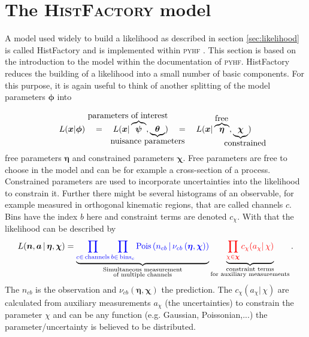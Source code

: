 \section{The \textsc{HistFactory} model}\label{sec:histfactory_model}

A model used widely to build a likelihood as described in section \ref{sec:likelihood} is called HistFactory \citep{cranmer2012histfactory} and is implemented within \textsc{pyhf} \citep{pyhf}. This section is based on the introduction to the model within the documentation of \textsc{pyhf}. HistFactory reduces the building of a likelihood into a small number of basic components. For this purpose, it is again useful to think of another splitting of the model parameters $\bm{\phi}$ into

\newcommand{\freeset}{\bm{\eta}}
\newcommand{\constrset}{\bm{\chi}}
\newcommand{\singleconstr}{\chi}
\newcommand{\channelcounts}{\bm{n}}
\newcommand{\auxdata}{\bm{a}}
\newcommand{\poiset}{\bm{\psi}}
\newcommand{\nuisset}{\bm{\theta}}
\newcommand{\fullset}{\bm{\phi}}
\newcommand{\singlefull}{\phi}


\begin{equation}
 L(\bm{x}|\fullset) \quad=\quad
 L(\bm{x}|\overbrace{\poiset}^{\llap{\text{parameters of interest}}},\underbrace{\nuisset}_{\llap{\text{nuisance parameters}}}) \quad=\quad
 L(\bm{x}|\overbrace{\freeset}^{\rlap{\text{free}}},\underbrace{\constrset}_{\rlap{\text{constrained}}}) 
\end{equation}
free parameters $\freeset$ and constrained parameters $\constrset$. Free parameters are free to choose in the model and can be for example a cross-section of a process. Constrained parameters are used to incorporate uncertainties into the likelihood to constrain it. Further there might be several histograms of an observable, for example measured in orthogonal kinematic regions, that are called channels $c$. Bins have the index $b$ here and constraint terms are denoted $c_{\singleconstr}$. With that the likelihood can be described by 
\begin{equation}
L(\channelcounts, \auxdata \,|\,\freeset,\constrset) = \underbrace{\color{blue}{\prod_{c\in\mathrm{\,channels}} \prod_{b \in \mathrm{\,bins}_c}\textrm{Pois}\left(n_{cb} \,\middle|\, \nu_{cb}\left(\freeset,\constrset\right)\right)}}_{\substack{\text{Simultaneous measurement}\\%
\text{of multiple channels}}} \underbrace{\color{red}{\prod_{\singleconstr \in \constrset} c_{\singleconstr}(a_{\singleconstr} |\, \singleconstr)}}_{\substack{\text{constraint terms}\\%
\text{for }\text{auxiliary measurements}}}.
\end{equation}
The $n_{cb}$ is the observation and $\nu_{cb}(\freeset,\constrset)$ the prediction. The $c_{\singleconstr}(a_{\singleconstr} |\, \singleconstr)$ are calculated from auxiliary measurements $a_{\singleconstr}$ (the uncertainties) to constrain the parameter $\singleconstr$ and can be any function (e.g. Gaussian, Poissonian,...) the parameter/uncertainty is believed to be distributed.

